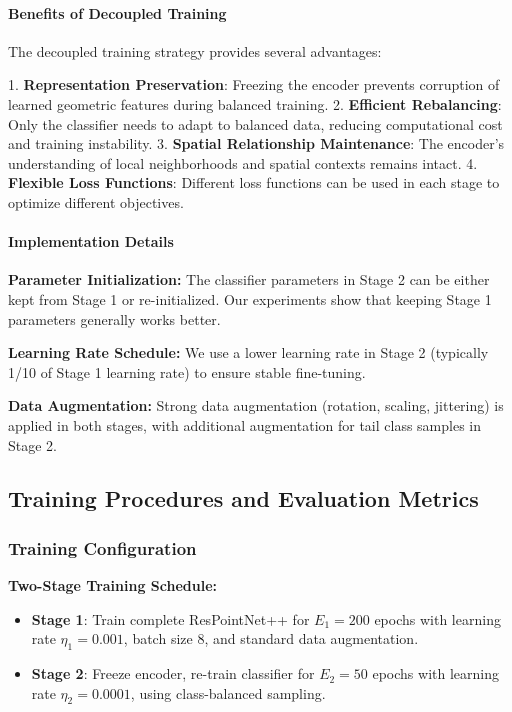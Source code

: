 \documentclass[preprint,12pt]{elsarticle}
\begin{document}
\paragraph{Benefits of Decoupled Training}
The decoupled training strategy provides several advantages:

1. \textbf{Representation Preservation}: Freezing the encoder prevents corruption of learned geometric features during balanced training.
2. \textbf{Efficient Rebalancing}: Only the classifier needs to adapt to balanced data, reducing computational cost and training instability.
3. \textbf{Spatial Relationship Maintenance}: The encoder's understanding of local neighborhoods and spatial contexts remains intact.
4. \textbf{Flexible Loss Functions}: Different loss functions can be used in each stage to optimize different objectives.

\paragraph{Implementation Details}
\textbf{Parameter Initialization:} The classifier parameters in Stage 2 can be either kept from Stage 1 or re-initialized. Our experiments show that keeping Stage 1 parameters generally works better.

\textbf{Learning Rate Schedule:} We use a lower learning rate in Stage 2 (typically 1/10 of Stage 1 learning rate) to ensure stable fine-tuning.

\textbf{Data Augmentation:} Strong data augmentation (rotation, scaling, jittering) is applied in both stages, with additional augmentation for tail class samples in Stage 2.

\subsection{Training Procedures and Evaluation Metrics}
\label{sec:training_eval}

\subsubsection{Training Configuration}
\textbf{Two-Stage Training Schedule:}
\begin{itemize}
    \item \textbf{Stage 1}: Train complete ResPointNet++ for $E_1 = 200$ epochs with learning rate $\eta_1 = 0.001$, batch size 8, and standard data augmentation.
    \item \textbf{Stage 2}: Freeze encoder, re-train classifier for $E_2 = 50$ epochs with learning rate $\eta_2 = 0.0001$, using class-balanced sampling.
\end{itemize}
\end{document}
